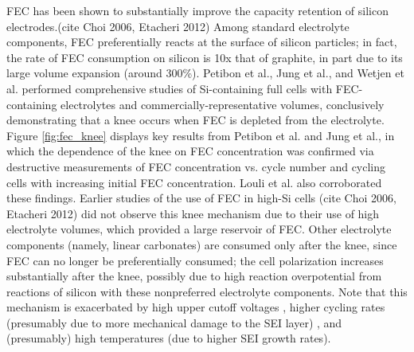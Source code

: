 \documentclass{article}
\begin{document}
FEC has been shown to substantially improve the capacity retention of silicon electrodes.(cite Choi 2006, Etacheri 2012)
Among standard electrolyte components, FEC preferentially reacts at the surface of silicon particles; in fact, the rate of FEC consumption on silicon is 10x that of graphite, in part due to its large volume expansion (around 300\%).\cite{wetjen_differentiating_2017}
Petibon et al.\cite{petibon_studies_2016},
Jung et al.\cite{jung_consumption_2016},
and Wetjen et al.\cite{wetjen_differentiating_2017}
performed comprehensive studies of Si-containing full cells with FEC-containing electrolytes and commercially-representative volumes,
conclusively demonstrating that a knee occurs when FEC is depleted from the electrolyte.
Figure \ref{fig:fec_knee} displays key results from Petibon et al.\cite{petibon_studies_2016} and
Jung et al.\cite{jung_consumption_2016}, in which the dependence of the knee on FEC concentration was confirmed via destructive measurements of FEC concentration vs. cycle number\cite{petibon_studies_2016} and cycling cells with increasing initial FEC concentration\cite{jung_consumption_2016}.
Louli et al.\cite{louli_operando_2019} also corroborated these findings.
Earlier studies of the use of FEC in high-Si cells (cite Choi 2006, Etacheri 2012) did not observe this knee mechanism due to their use of high electrolyte volumes, which provided a large reservoir of FEC.
Other electrolyte components (namely, linear carbonates) are consumed only after the knee, since FEC can no longer be preferentially consumed\cite{petibon_studies_2016}; the cell polarization increases substantially after the knee\cite{petibon_studies_2016, jung_consumption_2016, wetjen_differentiating_2017}, possibly due to high reaction overpotential from reactions of silicon with these nonpreferred electrolyte components.
Note that this mechanism is exacerbated by high upper cutoff voltages \cite{petibon_studies_2016}, higher cycling rates (presumably due to more mechanical damage to the SEI layer) \cite{petibon_studies_2016}, and (presumably) high temperatures (due to higher SEI growth rates).
\end{document}
